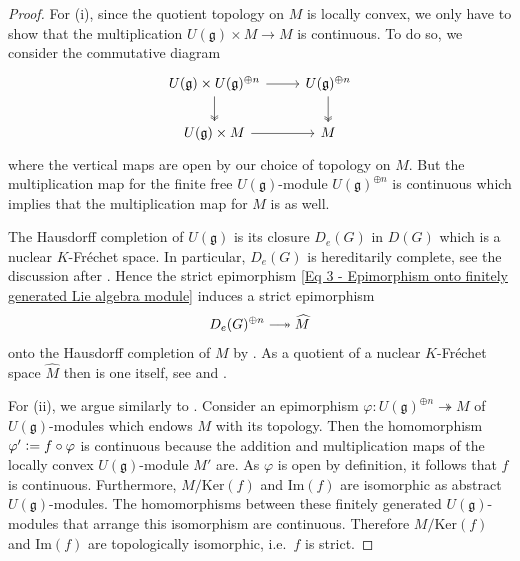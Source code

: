 \documentclass[a4paper, reqno, 10pt]{amsart}
\theoremstyle{definition}
\numberwithin{equation}{section}
\newcommand{\defeq}{\vcentcolon=}
\renewcommand{\Im}{{\mathrm{Im}}}
\newcommand{\Ker}{{\mathrm{Ker}}}
\newcommand{\ra}{\rightarrow}
\newcommand{\Fg}{{\mathfrak {g}}}
\DeclareRobustCommand\longtwoheadrightarrow
{\relbar\joinrel\twoheadrightarrow}
\begin{document}
\begin{proof}
	For (i), since the quotient topology on $M$ is locally convex, we only have to show that the multiplication $U(\Fg) \times M \ra M$ is continuous.
	To do so, we consider the commutative diagram
	\begin{equation*}
		\begin{tikzcd}
			U(\Fg) \times U(\Fg)^{\oplus n} \ar[r] \ar[d, two heads] & U(\Fg)^{\oplus n} \ar[d, two heads] \\
			U(\Fg) \times M \ar[r] & M
		\end{tikzcd}
	\end{equation*}
	where the vertical maps are open by our choice of topology on $M$.
	But the multiplication map for the finite free $U(\Fg)$-module $U(\Fg)^{\oplus n}$ is continuous which implies that the multiplication map for $M$ is as well.
	
	
	The Hausdorff completion of $U(\Fg)$ is its closure $D_e(G)$ in $D(G)$ which is a nuclear $K$-Fr\'echet space.
	In particular, $D_e(G)$ is hereditarily complete, see the discussion after \cite[Def.\ 1.1.39]{Emerton17LocAnVect}.
	Hence the strict epimorphism \eqref{Eq 3 - Epimorphism onto finitely generated Lie algebra module} induces a strict epimorphism
	\[ D_e(G)^{\oplus n} \longtwoheadrightarrow \widehat{M} \]
	onto the Hausdorff completion of $M$ by \cite[Cor.\ 2.2]{BreuilHerzig18TowardsFinSlopePartGLn}.
	As a quotient of a nuclear $K$-Fr\'echet space $\widehat{M}$ then is one itself, see \cite[Prop.\ 8.3]{Schneider02NonArchFunctAna} and \cite[Prop.\ 19.4 (ii)]{Schneider02NonArchFunctAna}.
	
	
	For (ii), we argue similarly to \cite[3.7.3 Prop.\ 2]{BoschGuentzerRemmert84NonArchAna}.
	Consider an epimorphism $\varphi \colon U(\Fg)^{\oplus n} \twoheadrightarrow M$ of $U(\Fg)$-modules which endows $M$ with its topology.
	Then the homomorphism $\varphi' \defeq f \circ \varphi$ is continuous because the addition and multiplication maps of the locally convex $U(\Fg)$-module $M'$ are.
	As $\varphi$ is open by definition, it follows that $f$ is continuous.
	Furthermore, $M/\Ker(f)$ and $\Im(f)$ are isomorphic as abstract $U(\Fg)$-modules.
	The homomorphisms between these finitely generated $U(\Fg)$-modules that arrange this isomorphism are continuous.
	Therefore $M/\Ker(f)$ and $\Im(f)$ are topologically isomorphic, i.e.\ $f$ is strict.	
\end{proof}
\end{document}
